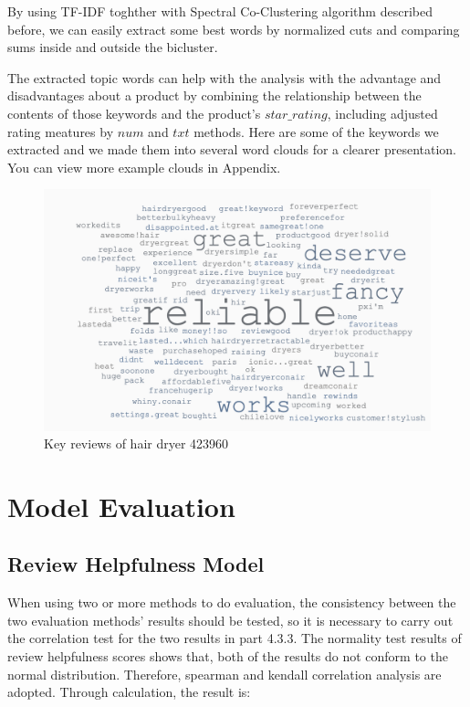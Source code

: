 \documentclass{mcmthesis}
\begin{document}
\quad \quad By using TF-IDF toghther with Spectral Co-Clustering algorithm described before, we can easily extract some best words by normalized cuts and comparing sums inside and outside the bicluster.

The extracted topic words can help with the analysis with the advantage and disadvantages about a product by combining the relationship between the contents of those keywords and the product's $star\_rating$, including adjusted rating meatures by $num$ and $txt$ methods. Here are some of the keywords we extracted  and we made them into several word clouds for a clearer presentation. You can view more example clouds in Appendix.
\begin{figure}[H] 
\centering
\includegraphics[width=.9\textwidth,height= 7.5 cm]{figures/cloud.png}
\caption{Key reviews of hair dryer 423960}
\end{figure}

\section{Model Evaluation}

\subsection{Review Helpfulness Model}

\quad \quad When using two or more methods to do evaluation, the consistency  between the two evaluation methods' results should be tested, so it is necessary to carry out the correlation test for the two results in part 4.3.3. 
The normality test results of review helpfulness scores shows that, both of the results do not conform to the normal distribution. Therefore, spearman and kendall correlation analysis are adopted. Through calculation, the result is:
\end{document}
